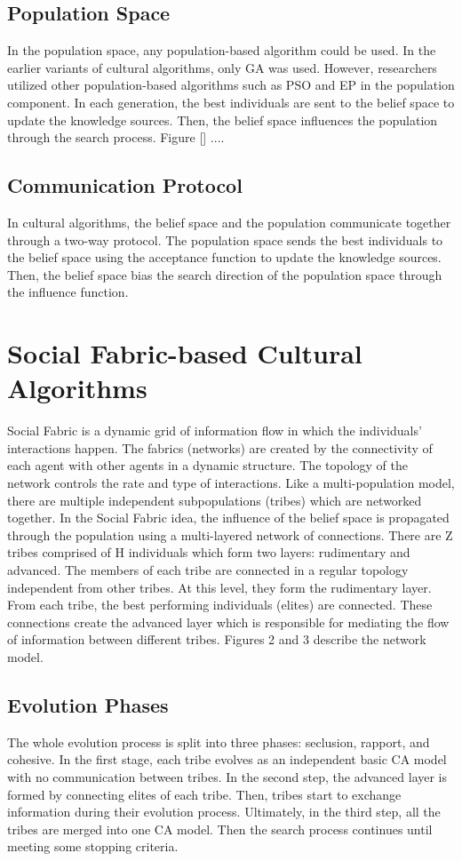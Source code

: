 \subsection{Population Space}
In the population space, any population-based algorithm could be used. In the earlier variants of cultural algorithms, only GA was used. However, researchers utilized other population-based algorithms such as PSO and EP in the population component. In each generation, the best individuals are sent to the belief space to update the knowledge sources. Then, the belief space influences the population through the search process. Figure [] ....
\subsection{Communication Protocol}
In cultural algorithms, the belief space and the population communicate together through a two-way protocol. The population space sends the best individuals to the belief space using the acceptance function to update the knowledge sources. Then, the belief space bias the search direction of the population space through the influence function.
\section{Social Fabric-based Cultural Algorithms}
Social Fabric is a dynamic grid of information flow in which the individuals’ interactions happen. The fabrics (networks) are created by the connectivity of each agent with other agents in a dynamic structure. The topology of the network controls the rate and type of interactions. Like a multi-population model, there are multiple independent subpopulations (tribes) which are networked together.\newline
In the Social Fabric idea, the influence of the belief space is propagated through the population using a multi-layered network of connections. There are Z tribes comprised of H individuals which form two layers: rudimentary and advanced. The members of each tribe are connected in a regular topology independent from other tribes. At this level, they form the rudimentary layer. From each tribe, the best performing individuals (elites) are connected. These connections create the advanced layer which is responsible for mediating the flow of information between different tribes. Figures 2 and 3 describe the network model.
\subsection{Evolution Phases}The whole evolution process is split into three phases: seclusion, rapport, and cohesive. In the first stage, each tribe evolves as an independent basic CA model with no communication between tribes. In the second step, the advanced layer is formed by connecting elites of each tribe. Then, tribes start to exchange information during their evolution process. Ultimately, in the third step, all the tribes are merged into one CA model. Then the search process continues until meeting some stopping criteria.
